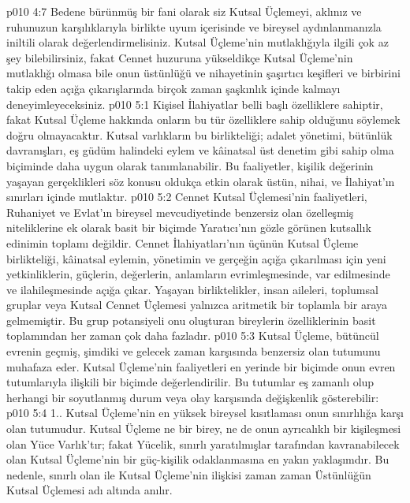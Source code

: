 \vs p010 4:7 Bedene bürünmüş bir fani olarak siz Kutsal Üçlemeyi, aklınız ve ruhunuzun karşılıklarıyla birlikte uyum içerisinde ve bireysel aydınlanmanızla iniltili olarak değerlendirmelisiniz. Kutsal Üçleme’nin mutlaklığıyla ilgili çok az şey bilebilirsiniz, fakat Cennet huzuruna yükseldikçe Kutsal Üçleme’nin mutlaklığı olmasa bile onun üstünlüğü ve nihayetinin şaşırtıcı keşifleri ve birbirini takip eden açığa çıkarışlarında birçok zaman şaşkınlık içinde kalmayı deneyimleyeceksiniz.
\vs p010 5:1 Kişisel İlahiyatlar belli başlı özelliklere sahiptir, fakat Kutsal Üçleme hakkında onların bu tür özelliklere sahip olduğunu söylemek doğru olmayacaktır. Kutsal varlıkların bu birlikteliği; adalet yönetimi, bütünlük davranışları, eş güdüm halindeki eylem ve kâinatsal üst denetim gibi  sahip olma biçiminde daha uygun olarak tanımlanabilir. Bu faaliyetler, kişilik değerinin yaşayan gerçeklikleri söz konusu oldukça etkin olarak üstün, nihai, ve İlahiyat’ın sınırları içinde mutlaktır.
\vs p010 5:2 Cennet Kutsal Üçlemesi’nin faaliyetleri, Ruhaniyet ve Evlat’ın bireysel mevcudiyetinde benzersiz olan özelleşmiş niteliklerine ek olarak basit bir biçimde Yaratıcı’nın gözle görünen kutsallık edinimin toplamı değildir. Cennet İlahiyatları’nın üçünün Kutsal Üçleme birlikteliği, kâinatsal eylemin, yönetimin ve gerçeğin açığa çıkarılması için yeni yetkinliklerin, güçlerin, değerlerin, anlamların evrimleşmesinde, var edilmesinde ve ilahileşmesinde açığa çıkar. Yaşayan birliktelikler, insan aileleri, toplumsal gruplar veya Kutsal Cennet Üçlemesi yalnızca aritmetik bir toplamla bir araya gelmemiştir. Bu grup potansiyeli onu oluşturan bireylerin özelliklerinin basit toplamından her zaman çok daha fazladır.
\vs p010 5:3 Kutsal Üçleme, bütüncül evrenin geçmiş, şimdiki ve gelecek zaman karşısında benzersiz olan tutumunu muhafaza eder. Kutsal Üçleme’nin faaliyetleri en yerinde bir biçimde onun evren tutumlarıyla ilişkili bir biçimde değerlendirilir. Bu tutumlar eş zamanlı olup herhangi bir soyutlanmış durum veya olay karşısında değişkenlik gösterebilir:
\vs p010 5:4 1.\bibnobreakspace {}. Kutsal Üçleme’nin en yüksek bireysel kısıtlaması onun sınırlılığa karşı olan tutumudur. Kutsal Üçleme ne bir birey, ne de onun ayrıcalıklı bir kişileşmesi olan Yüce Varlık’tır; fakat Yücelik, sınırlı yaratılmışlar tarafından kavranabilecek olan Kutsal Üçleme’nin bir güç\hyp{}kişilik odaklanmasına en yakın yaklaşımdır. Bu nedenle, sınırlı olan ile Kutsal Üçleme’nin ilişkisi zaman zaman Üstünlüğün Kutsal Üçlemesi adı altında anılır.
